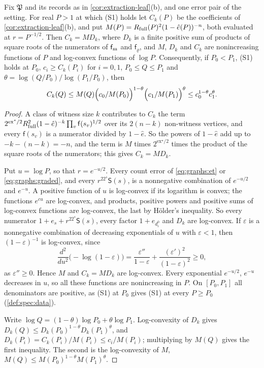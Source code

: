 \begin{lemma}\label{lem:logconvex-coefficients}
Fix $\mathfrak P$ and its records as in \cref{cor:extraction-leaf}(b), and one error
pair of the setting. For real $P>1$ at which \textup{(S1)} holds let $C_k(P)$ be the
coefficients of \cref{cor:extraction-leaf}(b), and put
$M(P)=R_{\rm full}(P)^2(1-\hat e(P))^{-n}$, both evaluated at $r=P^{-1/2}$. Then
$C_k=M D_k$, where $D_k$ is a finite positive sum of products of square roots of the
numerators of $\mathsf f_{\rm m}$ and $\mathsf f_\varrho$, and $M$, $D_k$ and $C_k$ are
nonincreasing functions of $P$ and log-convex functions of $\log P$. Consequently, if
$P_0<P_1$, \textup{(S1)} holds at $P_0$, $c_i\ge C_k(P_i)$ for $i=0,1$,
$P_0\le Q\le P_1$ and $\theta=\log(Q/P_0)/\log(P_1/P_0)$, then
\[
 C_k(Q)\le M(Q)\Bigl(\frac{c_0}{M(P_0)}\Bigr)^{1-\theta}
 \Bigl(\frac{c_1}{M(P_1)}\Bigr)^{\theta}\le c_0^{1-\theta}c_1^{\theta}.
\]
\end{lemma}

\begin{proof}
A class of witness size $k$ contributes to $C_k$ the term
$2^{\mathrm{ex}^\star/2}R_{\rm full}^2(1-\hat e)^{-k}\prod_v\mathsf f(s_v)^{1/2}$ over its
$2(n-k)$ non-witness vertices, and every $\mathsf f(s_v)$ is a numerator divided by
$1-\hat e$. So the powers of $1-\hat e$ add up to $-k-(n-k)=-n$, and the term is $M$
times $2^{\mathrm{ex}^\star/2}$ times the product of the square roots of the
numerators; this gives $C_k=MD_k$.

Put $u=\log P$, so that $r=e^{-u/2}$. Every count error of \eqref{eq:graphs:et} or
\eqref{eq:graphs:graded}, and every $r^22^s\mathsf S(s)$, is a nonnegative combination of
$e^{-u/2}$ and $e^{-u}$. A positive function of $u$ is log-convex if its logarithm is
convex; the functions $e^{cu}$ are log-convex, and products, positive powers and
positive sums of log-convex functions are log-convex, the last by H\"older's
inequality. So every numerator $1+e_s+r^22^s\mathsf S(s)$, every factor $1+e_{d^0_i}$
and $D_k$ are log-convex. If $\varepsilon$ is a nonnegative combination of decreasing
exponentials of $u$ with $\varepsilon<1$, then $(1-\varepsilon)^{-1}$ is log-convex,
since
\[
 \frac{d^2}{du^2}\bigl(-\log(1-\varepsilon)\bigr)
 =\frac{\varepsilon''}{1-\varepsilon}+\frac{(\varepsilon')^2}{(1-\varepsilon)^2}\ge0,
\]
as $\varepsilon''\ge0$. Hence $M$ and $C_k=MD_k$ are log-convex. Every exponential
$e^{-u/2}$, $e^{-u}$ decreases in $u$, so all these functions are nonincreasing in
$P$. On $[P_0,P_1]$ all denominators are positive, as (S1) at $P_0$ gives (S1) at every
$P\ge P_0$ (\cref{def:spec:data}).

Write $\log Q=(1-\theta)\log P_0+\theta\log P_1$. Log-convexity of $D_k$ gives
$D_k(Q)\le D_k(P_0)^{1-\theta}D_k(P_1)^\theta$, and $D_k(P_i)=C_k(P_i)/M(P_i)\le
c_i/M(P_i)$; multiplying by $M(Q)$ gives the first inequality. The second is the
log-convexity of $M$, $M(Q)\le M(P_0)^{1-\theta}M(P_1)^\theta$.
\end{proof}

